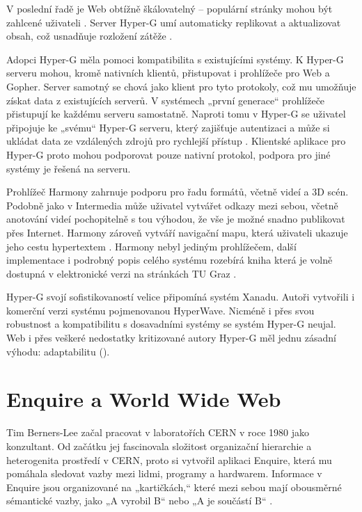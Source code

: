 V poslední řadě je  Web obtížně škálovatelný -- populární stránky mohou být zahlcené uživateli \autocite[207]{Andrews1995}. Server Hyper-G umí automaticky replikovat a aktualizovat obsah, což usnadňuje rozložení zátěže \autocites[10]{Andrews1995}[38]{Muller-Prove2002}.

Adopci Hyper-G měla pomoci kompatibilita s existujícími systémy. K Hyper-G serveru mohou, kromě nativních klientů, přistupovat i prohlížeče pro Web a Gopher. Server samotný se chová jako klient pro tyto protokoly, což mu umožňuje získat data z existujících serverů. V systémech „první generace“ prohlížeče přistupují ke každému serveru samostatně. Naproti tomu v Hyper-G se uživatel připojuje ke „svému“ Hyper-G serveru, který zajišťuje autentizaci a může si ukládat data ze vzdálených zdrojů pro rychlejší přístup \autocite[211]{Andrews1995}. Klientské aplikace pro Hyper-G proto mohou podporovat pouze nativní protokol, podpora pro jiné systémy je řešená na serveru.

Prohlížeč Harmony zahrnuje podporu pro řadu formátů, včetně videí a 3D scén. Podobně jako v Intermedia může uživatel vytvářet odkazy mezi sebou, včetně anotování videí \autocite[213]{Andrews1995} pochopitelně s tou výhodou, že vše je možné snadno publikovat přes Internet. Harmony zároveň vytváří navigační mapu, která uživateli ukazuje jeho cestu hypertextem \autocite[214]{Andrews1995}. Harmony nebyl jediným prohlížečem, další implementace i podrobný popis celého systému rozebírá kniha  která je volně dostupná v elektronické verzi na stránkách TU Graz \autocite{Maurer1996}.

Hyper-G svojí sofistikovaností velice připomíná systém Xanadu. Autoři vytvořili i komerční verzi systému pojmenovanou HyperWave. Nicméně i přes svou robustnost a kompatibilitu s dosavadními systémy se systém Hyper-G neujal. Web i přes veškeré nedostatky kritizované autory Hyper-G měl jednu zásadní výhodu: adaptabilitu ().

\section{Enquire a World Wide Web}
\label{sec:www}

Tim Berners-Lee začal pracovat v laboratořích CERN v roce 1980 jako konzultant. Od začátku jej fascinovala složitost organizační hierarchie a heterogenita prostředí v CERN, proto si vytvořil aplikaci Enquire, která mu pomáhala sledovat vazby mezi lidmi, programy a hardwarem. Informace v Enquire jsou organizované na „kartičkách,“ které mezi sebou mají obousměrné sémantické vazby, jako „A vyrobil B“ nebo „A je součástí B“ \autocite{Berners-Lee1994}. 

